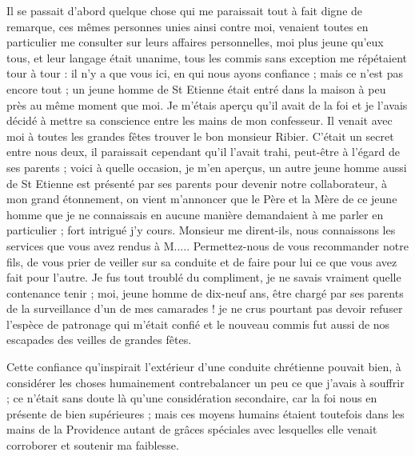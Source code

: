 \documentclass[11pt,a4paper]{report}
\begin{document}
Il se passait d'abord quelque chose qui me paraissait tout à fait digne de remarque, ces mêmes personnes unies ainsi contre moi, venaient toutes en particulier me consulter sur leurs affaires personnelles, moi plus jeune qu'eux tous, et leur langage était unanime, tous les commis sans exception me répétaient tour à tour : il n'y a que vous ici, en qui nous ayons confiance ; mais ce n'est pas encore tout ; un jeune homme de St Etienne était entré dans la maison à peu près au même moment que moi. Je m'étais aperçu qu'il avait de la foi et je l'avais décidé à mettre sa conscience entre les mains de mon confesseur. Il venait avec moi à toutes les grandes fêtes trouver le bon monsieur Ribier. C'était un secret entre nous deux, il paraissait cependant qu'il l'avait trahi, peut-être à l'égard de ses parents ; voici à quelle occasion, je m'en aperçus, un autre jeune homme aussi de St Etienne est présenté par ses parents pour devenir notre collaborateur, à mon grand étonnement, on vient m'annoncer que le Père et la Mère de ce jeune homme que je ne connaissais en aucune manière demandaient à me parler en particulier ; fort intrigué j'y cours. Monsieur me dirent-ils, nous connaissons les services que vous avez rendus à M..... Permettez-nous de vous recommander notre fils, de vous prier de veiller sur sa conduite et de faire pour lui ce que vous avez fait pour l'autre. Je fus tout troublé du compliment, je ne savais vraiment quelle contenance tenir ; moi, jeune homme de dix-neuf ans, être chargé par ses parents de la surveillance d'un de mes camarades ! je ne crus pourtant pas devoir refuser l'espèce de patronage qui m'était confié et le nouveau commis fut aussi de nos escapades des veilles de grandes fêtes.

Cette confiance qu'inspirait l'extérieur d'une conduite chrétienne pouvait bien, à considérer les choses humainement contrebalancer un peu ce que j'avais à souffrir ; ce n'était sans doute là qu'une considération secondaire, car la foi nous en présente de bien supérieures ; mais ces moyens humains étaient toutefois dans les mains de la Providence autant de grâces spéciales avec lesquelles elle venait corroborer et soutenir ma faiblesse.
\end{document}
